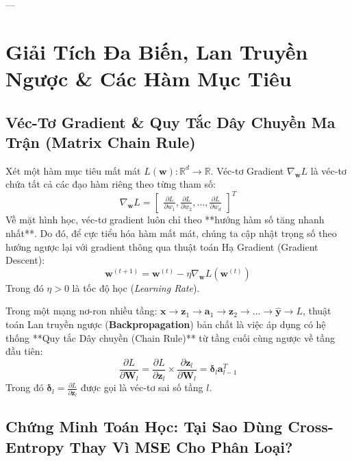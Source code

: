 ---

\section{Giải Tích Đa Biến, Lan Truyền Ngược \& Các Hàm Mục Tiêu}
\label{sec:calculus-optimization}

\subsection{Véc-Tơ Gradient \& Quy Tắc Dây Chuyền Ma Trận (Matrix Chain Rule)}

Xét một hàm mục tiêu mất mát $L(\mathbf{w}): \mathbb{R}^d \to \mathbb{R}$. Véc-tơ Gradient $\nabla_\mathbf{w} L$ là véc-tơ chứa tất cả các đạo hàm riêng theo từng tham số:
\begin{equation}
\nabla_\mathbf{w} L = \begin{bmatrix} \frac{\partial L}{\partial w_1}, \frac{\partial L}{\partial w_2}, \dots, \frac{\partial L}{\partial w_d} \end{bmatrix}^T
\end{equation}
Về mặt hình học, véc-tơ gradient luôn chỉ theo **hướng hàm số tăng nhanh nhất**. Do đó, để cực tiểu hóa hàm mất mát, chúng ta cập nhật trọng số theo hướng ngược lại với gradient thông qua thuật toán Hạ Gradient (Gradient Descent):
\begin{equation}
\mathbf{w}^{(t+1)} = \mathbf{w}^{(t)} - \eta \nabla_\mathbf{w} L(\mathbf{w}^{(t)})
\label{eq:gradient-descent}
\end{equation}
Trong đó $\eta > 0$ là tốc độ học (\textit{Learning Rate}).

Trong một mạng nơ-ron nhiều tầng: $\mathbf{x} \to \mathbf{z}_1 \to \mathbf{a}_1 \to \mathbf{z}_2 \to \dots \to \hat{\mathbf{y}} \to L$, thuật toán Lan truyền ngược (\textbf{Backpropagation}) bản chất là việc áp dụng có hệ thống **Quy tắc Dây chuyền (Chain Rule)** từ tầng cuối cùng ngược về tầng đầu tiên:
\begin{equation}
\frac{\partial L}{\partial \mathbf{W}_l} = \frac{\partial L}{\partial \mathbf{z}_l} \times \frac{\partial \mathbf{z}_l}{\partial \mathbf{W}_l} = \boldsymbol{\delta}_l \mathbf{a}_{l-1}^T
\label{eq:backprop-matrix-rule}
\end{equation}
Trong đó $\boldsymbol{\delta}_l = \frac{\partial L}{\partial \mathbf{z}_l}$ được gọi là véc-tơ sai số tầng $l$.

\subsection{Chứng Minh Toán Học: Tại Sao Dùng Cross-Entropy Thay Vì MSE Cho Phân Loại?}

